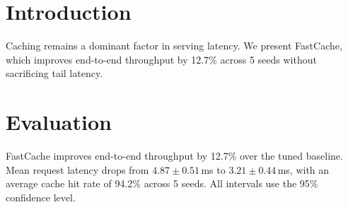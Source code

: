 \documentclass{article}
\begin{document}
\section{Introduction}
Caching remains a dominant factor in serving latency. We present FastCache,
which improves end-to-end throughput by 12.7\% across 5 seeds without
sacrificing tail latency. %

\section{Evaluation}
FastCache improves end-to-end throughput by 12.7\% over the tuned baseline.
Mean request latency drops from $4.87 \pm 0.51$\,ms to $3.21 \pm 0.44$\,ms,
with an average cache hit rate of 94.2\% across 5 seeds.
All intervals use the 95\% confidence level.
\end{document}
